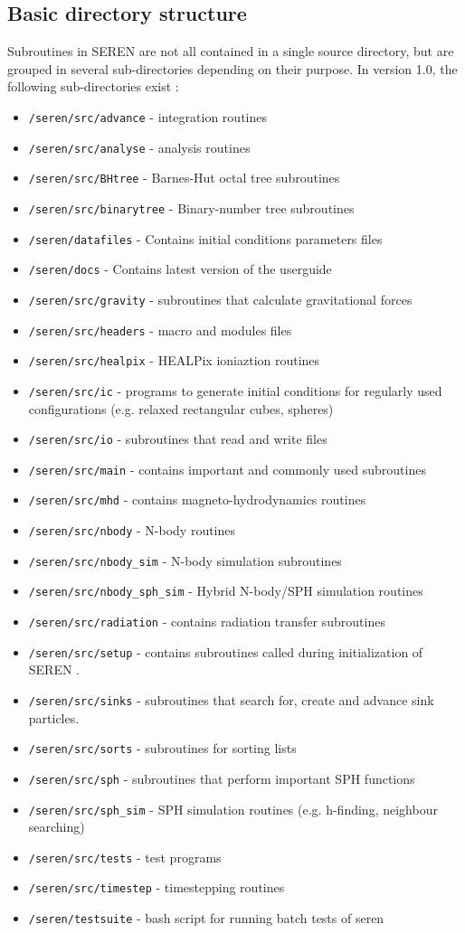 \documentclass[a4paper]{article}
\newcommand{\NAME}{SEREN }
\newcommand{\name}{seren}
\newcommand{\var}[1]{\texttt{#1}}
\begin{document}
\subsection{Basic directory structure}
Subroutines in \NAME are not all contained in a single source directory, 
but are grouped in several sub-directories depending on their purpose. 
In version 1.0, the following sub-directories exist : 
\begin{itemize}
\item \var{/\name/src/advance} - integration routines
\item \var{/\name/src/analyse} - analysis routines
\item \var{/\name/src/BHtree} - Barnes-Hut octal tree subroutines
\item \var{/\name/src/binarytree} - Binary-number tree subroutines
\item \var{/\name/datafiles} - Contains initial conditions parameters files
\item \var{/\name/docs} - Contains latest version of the userguide
\item \var{/\name/src/gravity} - subroutines that calculate gravitational forces
\item \var{/\name/src/headers} - macro and modules files
\item \var{/\name/src/healpix} - HEALPix ioniaztion routines
\item \var{/\name/src/ic} - programs to generate initial conditions for 
regularly used configurations (e.g. relaxed rectangular cubes, 
spheres)
\item \var{/\name/src/io} - subroutines that read and write files
\item \var{/\name/src/main} - contains important and commonly used 
subroutines
\item \var{/\name/src/mhd} - contains magneto-hydrodynamics routines
\item \var{/\name/src/nbody} - N-body routines
\item \var{/\name/src/nbody\_sim} - N-body simulation subroutines
\item \var{/\name/src/nbody\_sph\_sim} - Hybrid N-body/SPH simulation routines
\item \var{/\name/src/radiation} - contains radiation transfer subroutines
\item \var{/\name/src/setup} - contains subroutines called during initialization of \NAME .
\item \var{/\name/src/sinks} - subroutines that search for, create and 
advance sink particles. 
\item \var{/\name/src/sorts} - subroutines for sorting lists
\item \var{/\name/src/sph} - subroutines that perform important SPH functions 
\item \var{/\name/src/sph\_sim} - SPH simulation routines
(e.g. h-finding, neighbour searching)  
\item \var{/\name/src/tests} - test programs
\item \var{/\name/src/timestep} - timestepping routines
\item \var{/\name/testsuite} - bash script for running batch tests of seren
\end{itemize}
\end{document}
